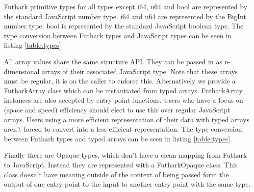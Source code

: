 \documentclass[11pt]{book}
\begin{document}
Futhark primitive types for all types except i64, u64 and bool are represented by the standard JavaScript number type. i64 and u64 are represented by the BigInt number type. bool is represented by the standard JavaScript boolean type. The type conversion between Futhark types and JavaScript types can be seen in listing \ref{table:types}.

All array values share the same structure API. They can be passed in as n-dimensional arrays of their associated JavaScript type. Note that these arrays must be regular, it is on the caller to enforce this.
Alternatively we provide a FutharkArray class which can be instantiated from typed arrays. FutharkArray instances are also accepted by entry point functions. Users who have a focus on (space and speed) efficiency should elect to use this over regular JavaScript arrays. Users using a more efficient representation of their data with typed arrays aren't forced to convert into a less efficient representation. The type conversion between Futhark types and typed arrays can be seen in listing \ref{table:types}.

Finally there are Opaque types, which don't have a clean mapping from Futhark to JavaScript. Instead they are represented with a FutharkOpaque class. This class doesn't have meaning outside of the context of being passed form the output of one entry point to the input to another entry point with the same type.
\end{document}
